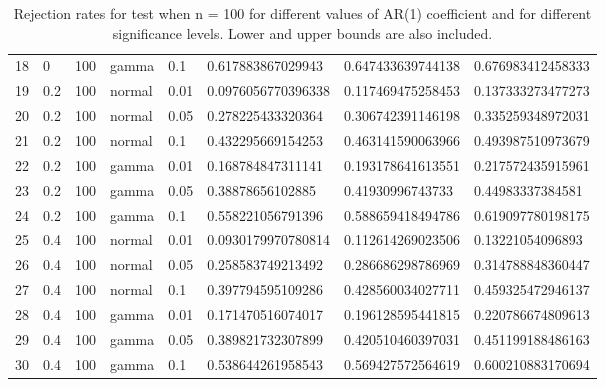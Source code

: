 \begin{table}[ht]
\begin{tabular}{rlllllll}
  18 & 0 & 100 & gamma & 0.1 & 0.617883867029943 & 0.647433639744138 & 0.676983412458333 \\ 
  19 & 0.2 & 100 & normal & 0.01 & 0.0976056770396338 & 0.117469475258453 & 0.137333273477273 \\ 
  20 & 0.2 & 100 & normal & 0.05 & 0.278225433320364 & 0.306742391146198 & 0.335259348972031 \\ 
  21 & 0.2 & 100 & normal & 0.1 & 0.432295669154253 & 0.463141590063966 & 0.493987510973679 \\ 
  22 & 0.2 & 100 & gamma & 0.01 & 0.168784847311141 & 0.193178641613551 & 0.217572435915961 \\ 
  23 & 0.2 & 100 & gamma & 0.05 & 0.38878656102885 & 0.41930996743733 & 0.44983337384581 \\ 
  24 & 0.2 & 100 & gamma & 0.1 & 0.558221056791396 & 0.588659418494786 & 0.619097780198175 \\ 
  25 & 0.4 & 100 & normal & 0.01 & 0.0930179970780814 & 0.112614269023506 & 0.13221054096893 \\ 
  26 & 0.4 & 100 & normal & 0.05 & 0.258583749213492 & 0.286686298786969 & 0.314788848360447 \\ 
  27 & 0.4 & 100 & normal & 0.1 & 0.397794595109286 & 0.428560034027711 & 0.459325472946137 \\ 
  28 & 0.4 & 100 & gamma & 0.01 & 0.171470516074017 & 0.196128595441815 & 0.220786674809613 \\ 
  29 & 0.4 & 100 & gamma & 0.05 & 0.389821732307899 & 0.420510460397031 & 0.451199188486163 \\ 
  30 & 0.4 & 100 & gamma & 0.1 & 0.538644261958543 & 0.569427572564619 & 0.600210883170694 \\ 
   \hline
\end{tabular}
\caption{Rejection rates for test when n = 100 for 
                   different values of AR(1) coefficient and for different 
                   significance levels. Lower and upper bounds are also 
                   included.} 
\label{table:rr_100}
\end{table}

